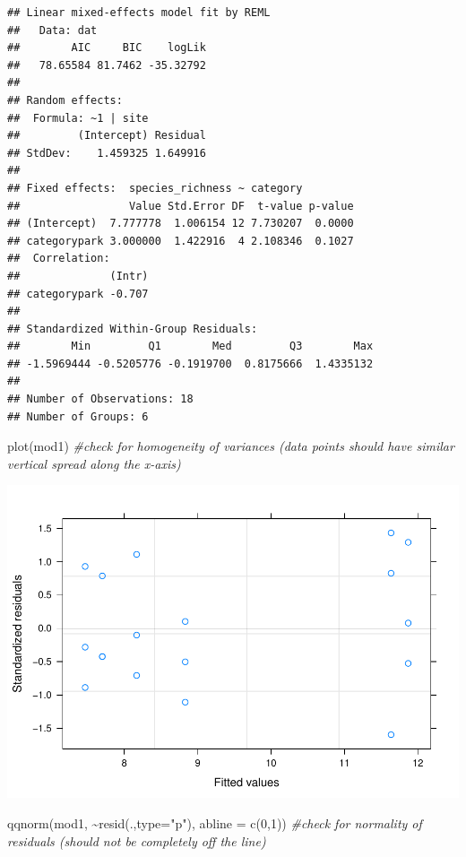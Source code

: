 \documentclass[
]{article}
\newenvironment{Shaded}{\begin{snugshade}}{\end{snugshade}}
\newcommand{\AttributeTok}[1]{\textcolor[rgb]{0.77,0.63,0.00}{#1}}
\newcommand{\CommentTok}[1]{\textcolor[rgb]{0.56,0.35,0.01}{\textit{#1}}}
\newcommand{\DecValTok}[1]{\textcolor[rgb]{0.00,0.00,0.81}{#1}}
\newcommand{\FunctionTok}[1]{\textcolor[rgb]{0.00,0.00,0.00}{#1}}
\newcommand{\NormalTok}[1]{#1}
\newcommand{\SpecialCharTok}[1]{\textcolor[rgb]{0.00,0.00,0.00}{#1}}
\newcommand{\StringTok}[1]{\textcolor[rgb]{0.31,0.60,0.02}{#1}}
\begin{document}
\begin{verbatim}
## Linear mixed-effects model fit by REML
##   Data: dat 
##        AIC     BIC    logLik
##   78.65584 81.7462 -35.32792
## 
## Random effects:
##  Formula: ~1 | site
##         (Intercept) Residual
## StdDev:    1.459325 1.649916
## 
## Fixed effects:  species_richness ~ category 
##                 Value Std.Error DF  t-value p-value
## (Intercept)  7.777778  1.006154 12 7.730207  0.0000
## categorypark 3.000000  1.422916  4 2.108346  0.1027
##  Correlation: 
##              (Intr)
## categorypark -0.707
## 
## Standardized Within-Group Residuals:
##        Min         Q1        Med         Q3        Max 
## -1.5969444 -0.5205776 -0.1919700  0.8175666  1.4335132 
## 
## Number of Observations: 18
## Number of Groups: 6
\end{verbatim}

\begin{Shaded}
\begin{Highlighting}[]
\FunctionTok{plot}\NormalTok{(mod1) }\CommentTok{\#check for homogeneity of variances (data points should have similar vertical spread along the x{-}axis)}
\end{Highlighting}
\end{Shaded}

\includegraphics{birdsdataanalysis_files/figure-latex/unnamed-chunk-7-1.pdf}

\begin{Shaded}
\begin{Highlighting}[]
\FunctionTok{qqnorm}\NormalTok{(mod1, }\SpecialCharTok{\textasciitilde{}}\FunctionTok{resid}\NormalTok{(.,}\AttributeTok{type=}\StringTok{"p"}\NormalTok{), }\AttributeTok{abline =} \FunctionTok{c}\NormalTok{(}\DecValTok{0}\NormalTok{,}\DecValTok{1}\NormalTok{)) }\CommentTok{\#check for normality of residuals (should not be completely off the line)}
\end{Highlighting}
\end{Shaded}
\end{document}
